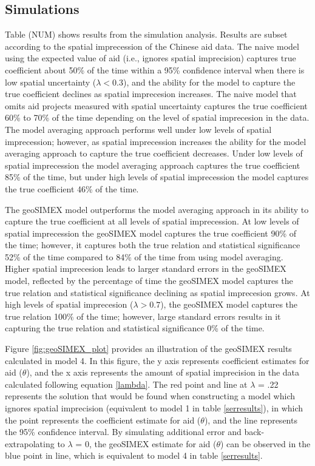 \subsection{Simulations}

Table (NUM) shows results from the simulation analysis. Results are subset according to the spatial imprecession of the Chinese aid data. The naive model using the expected value of aid (i.e., ignores spatial imprecision) captures true coefficient about 50\% of the time within a 95\% confidence interval when there is low spatial uncertainty ($\lambda < 0.3$), and the ability for the model to capture the true coefficient declines as spatial imprecesion increases. The naive model that omits aid projects measured with spatial uncertainty captures the true coefficient 60\% to 70\% of the time depending on the level of spatial imprecesion in the data. The model averaging approach performs well under low levels of spatial imprecession; however, as spatial imprecession increases the ability for the model averaging approach to capture the true coefficient decreases. Under low levels of spatial imprecession the model averaging approach captures the true coefficient 85\% of the time, but under high levels of spatial imprecession the model captures the true coefficient 46\% of the time. 
\par
The geoSIMEX model outperforms the model averaging approach in its ability to capture the true coefficient at all levels of spatial imprecession. At low levels of spatial imprecession the geoSIMEX model captures the true coefficient 90\% of the time; however, it captures both the true relation and statistical significance 52\% of the time compared to 84\% of the time from using model averaging. Higher spatial imprecesion leads to larger standard errors in the geoSIMEX model, reflected by the percentage of time the geoSIMEX model captures the true relation and statistical significance declining as spatial imprecesion grows. At high levels of spatial imprecesion ($\lambda > 0.7$), the geoSIMEX model captures the true relation 100\% of the time; however, large standard errors results in it capturing the true relation and statistical significance 0\% of the time.   
\par
Figure \ref{fig:geoSIMEX_plot} provides an illustration of the geoSIMEX results calculated in model 4.
In this figure, the y axis represents coefficient estimates for aid ($\theta$), and the x axis represents the amount of spatial imprecision in the data calculated following equation \ref{lambda}.
The red point and line at $\lambda$ = .22 represents the solution that would be found when constructing a model which ignores spatial imprecision (equivalent to model 1 in table \ref{serresults}), in which the point represents the coefficient estimate for aid ($\theta$), and the line represents the 95\% confidence interval.
By simulating additional error and back-extrapolating to $\lambda$ = 0, the geoSIMEX estimate for aid ($\theta$) can be observed in the blue point in line, which is equivalent to model 4 in table \ref{serresults}.

